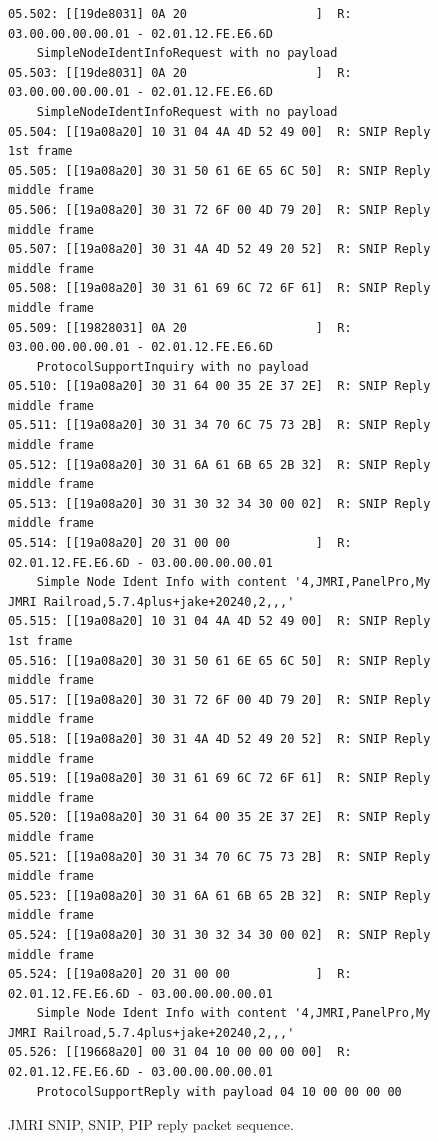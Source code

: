 \documentclass[11pt]{article}
\begin{document}
\begin{figure}[!htbp]
\begin{verbatim}
05.502: [[19de8031] 0A 20                  ]  R: 03.00.00.00.00.01 - 02.01.12.FE.E6.6D 
    SimpleNodeIdentInfoRequest with no payload
05.503: [[19de8031] 0A 20                  ]  R: 03.00.00.00.00.01 - 02.01.12.FE.E6.6D 
    SimpleNodeIdentInfoRequest with no payload
05.504: [[19a08a20] 10 31 04 4A 4D 52 49 00]  R: SNIP Reply 1st frame
05.505: [[19a08a20] 30 31 50 61 6E 65 6C 50]  R: SNIP Reply middle frame
05.506: [[19a08a20] 30 31 72 6F 00 4D 79 20]  R: SNIP Reply middle frame
05.507: [[19a08a20] 30 31 4A 4D 52 49 20 52]  R: SNIP Reply middle frame
05.508: [[19a08a20] 30 31 61 69 6C 72 6F 61]  R: SNIP Reply middle frame
05.509: [[19828031] 0A 20                  ]  R: 03.00.00.00.00.01 - 02.01.12.FE.E6.6D 
    ProtocolSupportInquiry with no payload
05.510: [[19a08a20] 30 31 64 00 35 2E 37 2E]  R: SNIP Reply middle frame
05.511: [[19a08a20] 30 31 34 70 6C 75 73 2B]  R: SNIP Reply middle frame
05.512: [[19a08a20] 30 31 6A 61 6B 65 2B 32]  R: SNIP Reply middle frame
05.513: [[19a08a20] 30 31 30 32 34 30 00 02]  R: SNIP Reply middle frame
05.514: [[19a08a20] 20 31 00 00            ]  R: 02.01.12.FE.E6.6D - 03.00.00.00.00.01 
    Simple Node Ident Info with content '4,JMRI,PanelPro,My JMRI Railroad,5.7.4plus+jake+20240,2,,,'
05.515: [[19a08a20] 10 31 04 4A 4D 52 49 00]  R: SNIP Reply 1st frame
05.516: [[19a08a20] 30 31 50 61 6E 65 6C 50]  R: SNIP Reply middle frame
05.517: [[19a08a20] 30 31 72 6F 00 4D 79 20]  R: SNIP Reply middle frame
05.518: [[19a08a20] 30 31 4A 4D 52 49 20 52]  R: SNIP Reply middle frame
05.519: [[19a08a20] 30 31 61 69 6C 72 6F 61]  R: SNIP Reply middle frame
05.520: [[19a08a20] 30 31 64 00 35 2E 37 2E]  R: SNIP Reply middle frame
05.521: [[19a08a20] 30 31 34 70 6C 75 73 2B]  R: SNIP Reply middle frame
05.523: [[19a08a20] 30 31 6A 61 6B 65 2B 32]  R: SNIP Reply middle frame
05.524: [[19a08a20] 30 31 30 32 34 30 00 02]  R: SNIP Reply middle frame
05.524: [[19a08a20] 20 31 00 00            ]  R: 02.01.12.FE.E6.6D - 03.00.00.00.00.01 
    Simple Node Ident Info with content '4,JMRI,PanelPro,My JMRI Railroad,5.7.4plus+jake+20240,2,,,'
05.526: [[19668a20] 00 31 04 10 00 00 00 00]  R: 02.01.12.FE.E6.6D - 03.00.00.00.00.01 
    ProtocolSupportReply with payload 04 10 00 00 00 00
\end{verbatim}
\caption{JMRI SNIP, SNIP, PIP reply packet sequence.}
\label{fig:JMRI_SNIP2PIP_reply_sequence}
\end{figure}
\end{document}
